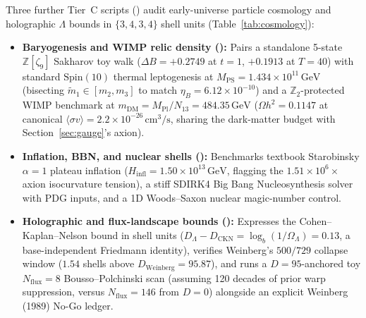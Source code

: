 Three further Tier~C scripts () audit early-universe particle cosmology and holographic
$\Lambda$ bounds in $\{3,4,3,4\}$ shell units (Table~\ref{tab:cosmology}):
\begin{itemize}[itemsep=2pt]
\item \textbf{Baryogenesis and WIMP relic density ():} Pairs a standalone 5-state $\mathbb{Z}[\zeta_9]$
Sakharov toy walk \cite{sakharov1967} ($\Delta B = +0.2749$ at $t = 1$, $+0.1913$ at $T = 40$) with standard
$\mathrm{Spin}(10)$ thermal leptogenesis at $M_{\mathrm{PS}} = 1.434 \times 10^{11}\,\mathrm{GeV}$ (bisecting
$\tilde{m}_1 \in [m_2, m_3]$ to match $\eta_B = 6.12 \times 10^{-10}$) and a $\mathbb{Z}_2$-protected WIMP benchmark at
$m_{\mathrm{DM}} = M_{\mathrm{Pl}}/N_{13} = 484.35\,\mathrm{GeV}$ ($\Omega h^2 = 0.1147$ at canonical
$\langle\sigma v\rangle = 2.2 \times 10^{-26}\,\mathrm{cm}^3/\mathrm{s}$, sharing the dark-matter budget with
Section~\ref{sec:gauge}'s axion).
\item \textbf{Inflation, BBN, and nuclear shells ():} Benchmarks textbook Starobinsky $\alpha = 1$
plateau inflation \cite{starobinsky1980} ($H_{\mathrm{infl}} = 1.50 \times 10^{13}\,\mathrm{GeV}$, flagging the
$1.51 \times 10^6\times$ axion isocurvature tension), a stiff SDIRK4 Big Bang Nucleosynthesis solver with PDG inputs,
and a 1D Woods--Saxon nuclear magic-number control.
\item \textbf{Holographic and flux-landscape bounds ():} Expresses the Cohen--Kaplan--Nelson bound
\cite{cohen1999} in shell units ($D_\Lambda - D_{\mathrm{CKN}} = \log_b(1/\Omega_\Lambda) = 0.13$, a base-independent
Friedmann identity), verifies Weinberg's $500/729$ collapse window \cite{weinberg1989} ($1.54$ shells above $D_{\mathrm{Weinberg}} = 95.87$),
and runs a $D = 95$-anchored toy $N_{\mathrm{flux}} = 8$ Bousso--Polchinski scan \cite{bousso2000} (assuming 120 decades
of prior warp suppression, versus $N_{\mathrm{flux}} = 146$ from $D = 0$) alongside an explicit Weinberg (1989) No-Go
ledger.
\end{itemize}


